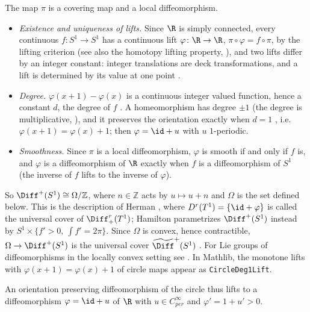 \begin{remark}
  \label{rem:ex-covering}
  The map $\pi$ is a covering map and a local diffeomorphism.
  \begin{itemize}
    \item \emph{Existence and uniqueness of lifts.} Since $\R$ is simply connected, every
    continuous $f \colon S^1 \to S^1$ has a continuous lift $\varphi \colon \R \to \R$,
    $\pi \circ \varphi = f \circ \pi$, by the lifting criterion \cite[\S1.3, Prop.~1.33]{Hat02}
    (see also the homotopy lifting property, \cite[Prop.~1.30]{Hat02}), and two lifts differ by
    an integer constant: integer translations are deck transformations, and a lift is
    determined by its value at one point \cite[Prop.~1.34]{Hat02}.
    \item \emph{Degree.} $\varphi(x + 1) - \varphi(x)$ is a continuous integer valued function,
    hence a constant $d$, the degree of $f$ \cite[Lemma 2.4.3, Def.~2.4.4]{KH95}. A homeomorphism
    has degree $\pm1$ (the degree is multiplicative, \cite[Prop.~8.2.2]{KH95}), and it
    preserves the orientation exactly when $d = 1$ \cite[\S11.1, p.~388]{KH95}, i.e.\ $\varphi(x + 1) = \varphi(x) + 1$;
    then $\varphi = \id + u$ with $u$ $1$-periodic.
    \item \emph{Smoothness.} Since $\pi$ is a local diffeomorphism, $\varphi$ is smooth if and
    only if $f$ is, and $\varphi$ is a diffeomorphism of $\R$ exactly when $f$ is a
    diffeomorphism of $S^1$ (the inverse of $f$ lifts to the inverse of $\varphi$).
  \end{itemize}
  So $\Diff^+(S^1) \cong \Omega/\mathbb Z$, where $n \in \mathbb Z$ acts by $u \mapsto u + n$ and
  $\Omega$ is the set defined below. This is the description of Herman
  \cite[Ch.~I, 1.7]{Her79}, where $D^r(T^1) = \{\id + \varphi\}$ is called the universal cover
  of $\Diff^r_+(T^1)$; Hamilton \cite[Part~I, Example~4.2.6]{Ham82} parametrizes
  $\Diff^+(S^1)$ instead by $S^1 \times \{f' > 0,\ \int f' = 2\pi\}$. Since $\Omega$ is convex,
  hence contractible, $\Omega \to \Diff^+(S^1)$ is the universal cover
  $\widetilde{\Diff}^+(S^1)$ \cite[Introduction (Remarque importante)]{Her79}. For Lie groups
  of diffeomorphisms in the locally convex setting see \cite{GN26}. In Mathlib, the monotone
  lifts with $\varphi(x+1) = \varphi(x) + 1$ of circle maps appear as
  \texttt{CircleDeg1Lift}.
\end{remark}

An orientation preserving diffeomorphism of the circle thus lifts to a diffeomorphism
$\varphi = \id + u$ of $\R$ with $u \in C^\infty_{per}$ and $\varphi' = 1 + u' > 0$.

